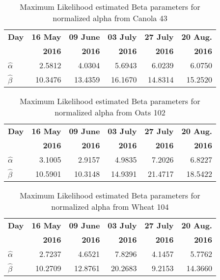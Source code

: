\documentclass[journal]{IEEEtran}
\begin{document}
\begin{table}[hbt]
  \centering
  \caption{Maximum Likelihood estimated Beta parameters for normalized alpha from Canola 43}
  \label{tab:params_alpha_cn43}
  \begin{tabular}{lrrrrr}
    \toprule
    \textbf{Day} & \textbf{16 May} & \textbf{09 June} & \textbf{03 July} & \textbf{27 July} & \textbf{20 Aug.}\\ 
                 & \textbf{2016} & \textbf{2016} & \textbf{2016} & \textbf{2016} & \textbf{2016}\\\midrule
    \textbf{$\hat{\alpha}$} & 2.5812 & 4.0304 & 5.6943 & 6.0239 & 6.0750\\
    \textbf{$\hat{\beta}$} & 10.3476 & 13.4359 & 16.1670 & 14.8314 & 15.2520\\
    \bottomrule
  \end{tabular}
\end{table}

\begin{table}[hbt]
  \centering
  \caption{Maximum Likelihood estimated Beta parameters for normalized alpha from Oats 102}
  \label{tab:params_alpha_ot102}
  \begin{tabular}{lrrrrr}
    \toprule
    \textbf{Day} & \textbf{16 May} & \textbf{09 June} & \textbf{03 July} & \textbf{27 July} & \textbf{20 Aug.}\\ 
                 & \textbf{2016} & \textbf{2016} & \textbf{2016} & \textbf{2016} & \textbf{2016}\\\midrule
    \textbf{$\hat{\alpha}$} & 3.1005  & 2.9157 & 4.9835 & 7.2026 & 6.8227\\
    \textbf{$\hat{\beta}$} & 10.5901 & 10.3148 & 14.9391 & 21.4717 & 18.5422\\
    \bottomrule
  \end{tabular}
\end{table}

\begin{table}[hbt]
  \centering
  \caption{Maximum Likelihood estimated Beta parameters for normalized alpha from Wheat 104}
  \label{tab:params_alpha_wt104}
  \begin{tabular}{lrrrrr}
    \toprule
    \textbf{Day} & \textbf{16 May} & \textbf{09 June} & \textbf{03 July} & \textbf{27 July} & \textbf{20 Aug.}\\ 
                 & \textbf{2016} & \textbf{2016} & \textbf{2016} & \textbf{2016} & \textbf{2016}\\\midrule
    \textbf{$\hat{\alpha}$} & 2.7237 & 4.6521 & 7.8296 & 4.1457 & 5.7762\\
    \textbf{$\hat{\beta}$} & 10.2709 & 12.8761 & 20.2683 & 9.2153 & 14.3660\\
    \bottomrule
  \end{tabular}
\end{table}
\end{document}
